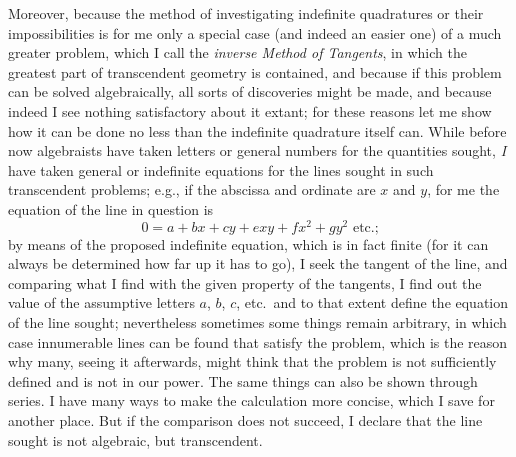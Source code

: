 \documentclass[twoside,openright]{article}
\begin{document}
Moreover, because the method of investigating indefinite quadratures
or their impossibilities is for me only a special case (and indeed an
easier one) of a much greater problem, which I call the {\em inverse
  Method of Tangents}, in which
the greatest part of transcendent geometry is contained, and because
if this problem can be solved algebraically, all sorts of discoveries
might be made, and because indeed I see nothing satisfactory about it
extant; for these reasons let me show how it can be done no less than
the indefinite quadrature itself can.  While before now algebraists
have taken letters or general numbers for the quantities sought, {\em
  I} have taken general or indefinite equations for the lines sought
in such transcendent problems; e.g., if the abscissa and ordinate are
$x$ and $y$, for me the equation of the line in question is
$$ 0 = a + bx + cy + exy + fx^2 + gy^2 \mbox{ etc.;}$$ 
by means of the proposed indefinite equation, which is in fact finite
(for it can always be determined how far up it has to go), I seek the
tangent of the line, and comparing what I find with the given property
of the tangents, I find out the value of the assumptive letters $a$,
$b$, $c$, etc.\ and to that extent define the equation of the line
sought; nevertheless sometimes
some things remain arbitrary, in which case innumerable lines can be
found that satisfy the problem, which is the reason why many, seeing
it afterwards, might think that the problem is not sufficiently
defined and is not in our power.  The same things can also be shown
through series.  I have many ways to make the calculation more
concise, which I save for another place.  But if the comparison does
not succeed, I declare that the line sought is not algebraic, but
transcendent.
\end{document}
